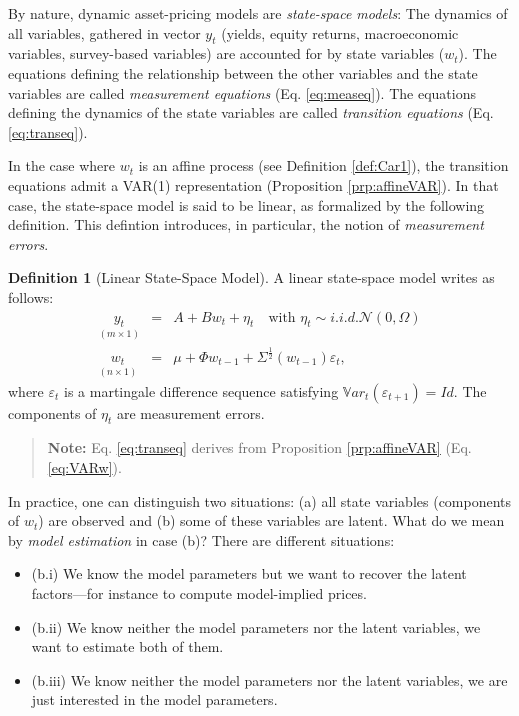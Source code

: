 \documentclass[
  12pt,
]{book}
\providecommand{\tightlist}{%
  \setlength{\itemsep}{0pt}\setlength{\parskip}{0pt}}
\theoremstyle{definition}
\newtheorem{definition}{Definition}[chapter]
\theoremstyle{definition}
\theoremstyle{definition}
\theoremstyle{definition}
\theoremstyle{remark}
\begin{document}
By nature, dynamic asset-pricing models are \emph{state-space models}: The dynamics of all variables, gathered in vector \(y_t\) (yields, equity returns, macroeconomic variables, survey-based variables) are accounted for by state variables (\(w_t\)). The equations defining the relationship between the other variables and the state variables are called \emph{measurement equations} (Eq. \eqref{eq:measeq}). The equations defining the dynamics of the state variables are called \emph{transition equations} (Eq. \eqref{eq:transeq}).

In the case where \(w_t\) is an affine process (see Definition \ref{def:Car1}), the transition equations admit a VAR(1) representation (Proposition \ref{prp:affineVAR}). In that case, the state-space model is said to be linear, as formalized by the following definition. This defintion introduces, in particular, the notion of \emph{measurement errors}.

\begin{definition}[Linear State-Space Model]
\protect\hypertarget{def:LSSM}{}\label{def:LSSM}A linear state-space model writes as follows:
\begin{eqnarray}
\underset{(m \times 1)}{y_t}  &=& A + Bw_t + \eta_t  \quad \mbox{with }  \eta_t \sim i.i.d. \mathcal{N}(0,\Omega) \label{eq:measeq} \\
\underset{(n \times 1)}{w_t} & =& \mu + \Phi w_{t-1} + \Sigma^{\frac{1}{2}}(w_{t-1}) \varepsilon_t,\label{eq:transeq}
\end{eqnarray}
where \(\varepsilon_t\) is a martingale difference sequence satisfying \(\mathbb{V}ar_t(\varepsilon_{t+1}) = Id\). The components of \(\eta_t\) are measurement errors.
\end{definition}

\begin{quote}
\textbf{Note:} Eq. \eqref{eq:transeq} derives from Proposition \ref{prp:affineVAR} (Eq. \eqref{eq:VARw}).
\end{quote}

In practice, one can distinguish two situations: (a) all state variables (components of \(w_t\)) are observed and (b) some of these variables are latent. What do we mean by \emph{model estimation} in case (b)? There are different situations:

\begin{itemize}
\tightlist
\item
  (b.i) We know the model parameters but we want to recover the latent factors---for instance to compute model-implied prices.
\item
  (b.ii) We know neither the model parameters nor the latent variables, we want to estimate both of them.
\item
  (b.iii) We know neither the model parameters nor the latent variables, we are just interested in the model parameters.
\end{itemize}
\end{document}
